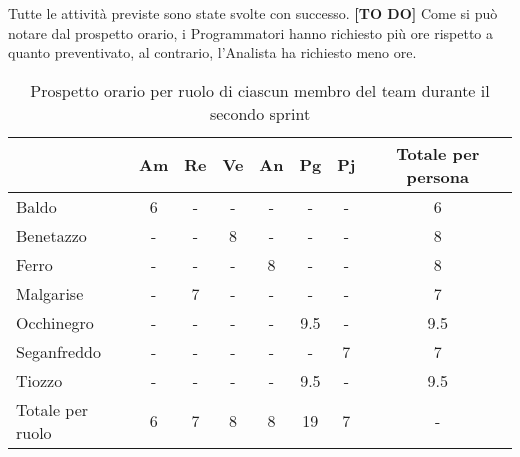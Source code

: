         \newblock
        \newpage

    Tutte le attività previste sono state svolte con successo. \textbf{[TO DO]}
    Come si può notare dal prospetto orario, i Programmatori hanno richiesto più ore rispetto a quanto preventivato, al contrario, l'Analista
    ha richiesto meno ore.
    \begin{table}[!h]
        \centering
        \begin{tabular}{ |l| c | c | c | c | c | c | c |} 
            \hline
            \textbf{} & \textbf{Am} & \textbf{Re} & \textbf{Ve} &\textbf{An} & \textbf{Pg} & \textbf{Pj} & \textbf{Totale per persona} \\
            \hline 
            Baldo       & 6 & - & - & - & - & - & 6   \\ 
            Benetazzo   & - & - & 8 & - & - & - & 8   \\ 
            Ferro       & - & - & - & 8 & - & - & 8   \\ 
            Malgarise   & - & 7 & - & - & - & - & 7   \\ 
            Occhinegro  & - & - & - & - & 9.5 & - & 9.5   \\ 
            Seganfreddo & - & - & - & - & - & 7 & 7   \\
            Tiozzo      & - & - & - & - & 9.5 & - & 9.5   \\ 
            \hline
            Totale per ruolo & 6 & 7 & 8 & 8 & 19 & 7 & - \\
            \hline
        \end{tabular}
        \caption{Prospetto orario per ruolo di ciascun membro del team durante il secondo sprint}
        \label{tab:6}
    \end{table}
    \newpage
